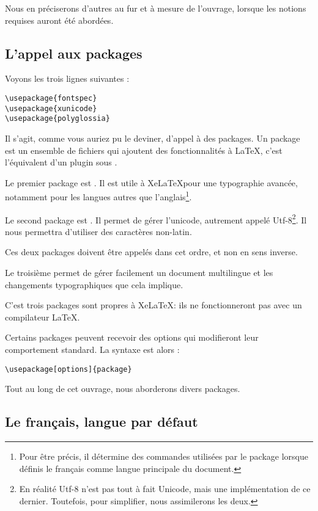 Nous en préciserons d'autres au fur et à mesure de l'ouvrage, lorsque les notions requises auront été abordées.

\subsection{L'appel aux packages}

Voyons les trois lignes suivantes : 
\begin{verbatim}
\usepackage{fontspec}
\usepackage{xunicode}
\usepackage{polyglossia}
\end{verbatim}

Il s'agit, comme vous auriez pu le deviner, d'appel à des packages. Un package est un ensemble de fichiers qui ajoutent des fonctionnalités à \LaTeX, c'est l'équivalent d'un plugin sous . 

Le premier package est . Il est utile à Xe\LaTeX  pour une typographie avancée, notamment pour les langues autres que l'anglais\footnote{Pour être précis, il détermine des commandes utilisées par le package  lorsque définis le fran\c cais comme langue principale du document.}. 

Le second package est . Il permet de gérer l'unicode, autrement appelé Utf-8\footnote{En réalité Utf-8 n'est pas tout à fait Unicode, mais une implémentation de ce dernier. Toutefois, pour simplifier, nous assimilerons les deux.}. Il nous permettra d'utiliser des caractères non-latin.

\begin{attention}
Ces deux packages doivent être appelés dans cet ordre, et non en sens inverse.
\end{attention}

Le troisième permet de gérer facilement un document multilingue et les changements typographiques que cela implique.

C'est trois packages sont propres à Xe\LaTeX  : ils ne fonctionneront pas avec un compilateur \LaTeX.

Certains packages peuvent recevoir des options qui modifieront leur comportement standard. La syntaxe est alors :

\verb|\usepackage[options]{package}|

Tout au long de cet ouvrage, nous aborderons divers packages.

\subsection{Le fran\c cais, langue par défaut\label{french}}

